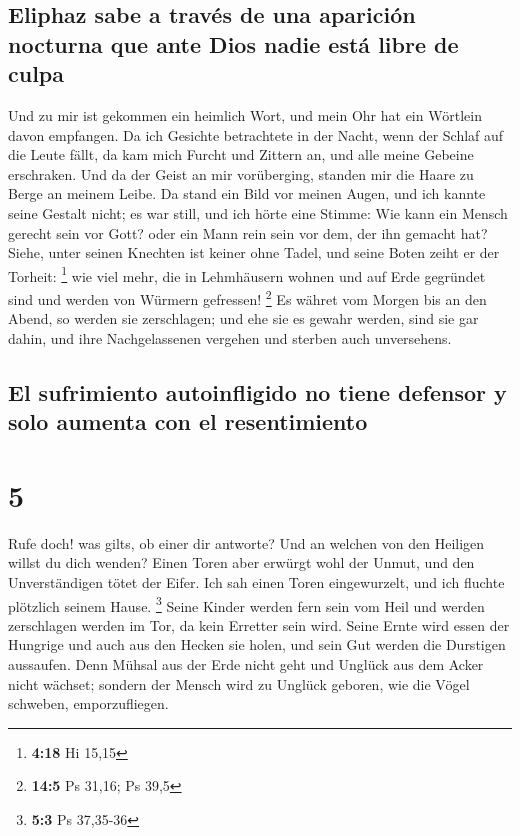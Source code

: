 \hypertarget{eliphaz-sabe-a-travuxe9s-de-una-apariciuxf3n-nocturna-que-ante-dios-nadie-estuxe1-libre-de-culpa}{%
\subsection{Eliphaz sabe a través de una aparición nocturna que ante
Dios nadie está libre de
culpa}\label{eliphaz-sabe-a-travuxe9s-de-una-apariciuxf3n-nocturna-que-ante-dios-nadie-estuxe1-libre-de-culpa}}

 Und zu mir ist gekommen ein heimlich Wort, und mein Ohr
hat ein Wörtlein davon empfangen.  Da ich Gesichte
betrachtete in der Nacht, wenn der Schlaf auf die Leute fällt,
 da kam mich Furcht und Zittern an, und alle meine
Gebeine erschraken.  Und da der Geist an mir vorüberging,
standen mir die Haare zu Berge an meinem Leibe.  Da stand
ein Bild vor meinen Augen, und ich kannte seine Gestalt nicht; es war
still, und ich hörte eine Stimme:  Wie kann ein Mensch
gerecht sein vor Gott? oder ein Mann rein sein vor dem, der ihn gemacht
hat?  Siehe, unter seinen Knechten ist keiner ohne Tadel,
und seine Boten zeiht er der Torheit: \footnote{\textbf{4:18} Hi 15,15}
 wie viel mehr, die in Lehmhäusern wohnen und auf Erde
gegründet sind und werden von Würmern gefressen! \footnote{\textbf{14:5}
  Ps 31,16; Ps 39,5}  Es währet vom Morgen bis an den
Abend, so werden sie zerschlagen; und ehe sie es gewahr werden, sind sie
gar dahin,  und ihre Nachgelassenen vergehen und sterben
auch unversehens.

\hypertarget{el-sufrimiento-autoinfligido-no-tiene-defensor-y-solo-aumenta-con-el-resentimiento}{%
\subsection{El sufrimiento autoinfligido no tiene defensor y solo
aumenta con el
resentimiento}\label{el-sufrimiento-autoinfligido-no-tiene-defensor-y-solo-aumenta-con-el-resentimiento}}

\hypertarget{section-4}{%
\section{5}\label{section-4}}

 Rufe doch! was gilts, ob einer dir antworte? Und an
welchen von den Heiligen willst du dich wenden?  Einen
Toren aber erwürgt wohl der Unmut, und den Unverständigen tötet der
Eifer.  Ich sah einen Toren eingewurzelt, und ich fluchte
plötzlich seinem Hause. \footnote{\textbf{5:3} Ps 37,35-36}
 Seine Kinder werden fern sein vom Heil und werden
zerschlagen werden im Tor, da kein Erretter sein wird. 
Seine Ernte wird essen der Hungrige und auch aus den Hecken sie holen,
und sein Gut werden die Durstigen aussaufen.  Denn Mühsal
aus der Erde nicht geht und Unglück aus dem Acker nicht wächset;
 sondern der Mensch wird zu Unglück geboren, wie die Vögel
schweben, emporzufliegen.

